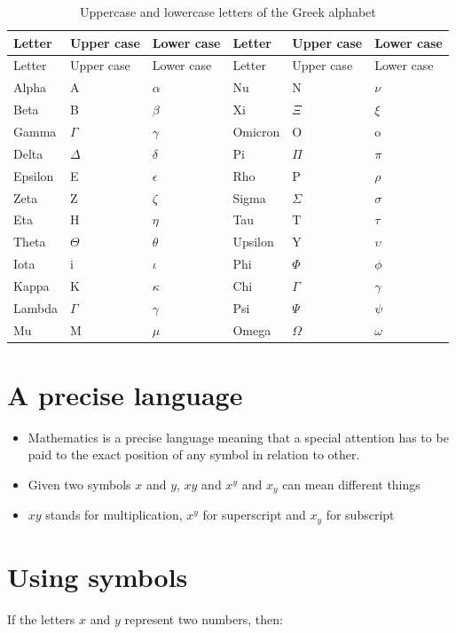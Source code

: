 \documentclass[
]{book}
\providecommand{\tightlist}{%
  \setlength{\itemsep}{0pt}\setlength{\parskip}{0pt}}
\theoremstyle{definition}
\theoremstyle{definition}
\theoremstyle{definition}
\theoremstyle{remark}
\begin{document}
\begin{longtable}[]{@{}llllll@{}}
\caption{\label{tab:greek-table} Uppercase and lowercase letters of the Greek alphabet}\tabularnewline
\toprule
Letter & Upper case & Lower case & Letter & Upper case & Lower case\tabularnewline
\midrule
\endfirsthead
\toprule
Letter & Upper case & Lower case & Letter & Upper case & Lower case\tabularnewline
\midrule
\endhead
Alpha & A & \(\alpha\) & Nu & N & \(\nu\)\tabularnewline
Beta & B & \(\beta\) & Xi & \(\Xi\) & \(\xi\)\tabularnewline
Gamma & \(\Gamma\) & \(\gamma\) & Omicron & O & o\tabularnewline
Delta & \(\Delta\) & \(\delta\) & Pi & \(\Pi\) & \(\pi\)\tabularnewline
Epsilon & E & \(\epsilon\) & Rho & P & \(\rho\)\tabularnewline
Zeta & Z & \(\zeta\) & Sigma & \(\Sigma\) & \(\sigma\)\tabularnewline
Eta & H & \(\eta\) & Tau & T & \(\tau\)\tabularnewline
Theta & \(\Theta\) & \(\theta\) & Upsilon & Y & \(\upsilon\)\tabularnewline
Iota & i & \(\iota\) & Phi & \(\Phi\) & \(\phi\)\tabularnewline
Kappa & K & \(\kappa\) & Chi & \(\Gamma\) & \(\gamma\)\tabularnewline
Lambda & \(\Gamma\) & \(\gamma\) & Psi & \(\Psi\) & \(\psi\)\tabularnewline
Mu & M & \(\mu\) & Omega & \(\Omega\) & \(\omega\)\tabularnewline
\bottomrule
\end{longtable}

\hypertarget{a-precise-language}{%
\section{A precise language}\label{a-precise-language}}

\begin{itemize}
\tightlist
\item
  Mathematics is a precise language meaning that a special attention has to be paid to the exact position of any symbol in relation to other.
\item
  Given two symbols \(x\) and \(y\), \(xy\) and \(x^y\) and \(x_y\) can mean different things
\item
  \(xy\) stands for multiplication, \(x^y\) for superscript and \(x_y\) for subscript
\end{itemize}

\hypertarget{using-symbols}{%
\section{Using symbols}\label{using-symbols}}

If the letters \(x\) and \(y\) represent two numbers, then:
\end{document}
